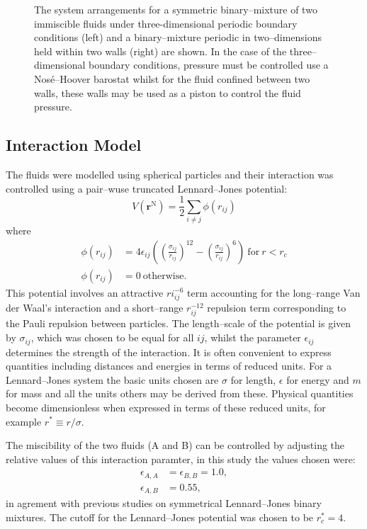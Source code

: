 \begin{figure}[h]
\caption{The system arrangements for a symmetric binary--mixture of two immiscible fluids under three-dimensional periodic boundary conditions (left) and a binary--mixture periodic in two--dimensions held within two walls (right) are shown. 
In the case of the three--dimensional boundary conditions, pressure must be controlled use a Nos\'{e}--Hoover barostat whilst for the fluid confined between two walls, these walls may be used as a piston to control the fluid pressure.}
\label{SetUp}
\end{figure}

\subsection{Interaction Model}\label{InteractionModel}
The fluids were modelled using spherical particles and their interaction was controlled using a pair--wuse truncated Lennard--Jones potential:
\begin{equation}
V \left( \mathbf{r}^{\mathrm{N}} \right) = \frac{1}{2} \sum_{i\neq j} \phi \left( r_{ij} \right)
\end{equation}
where
\begin{align}
\label{LJ}
\phi \left( r_{ij} \right) &= 4 \epsilon_{ij} \left( \left( \frac{\sigma_{ij}}{r_{ij}}\right)^{12} - \left( \frac{\sigma_{ij}}{r_{ij}}\right)^{6} \right)\ \mathrm{for}\ r < r_{c}\\
\phi \left( r_{ij} \right) &= 0\ \mathrm{otherwise}.
\end{align}
This potential involves an attractive $ri_{ij}^{-6}$ term accounting for the long--range Van der Waal's interaction and a short--range $r_{ij}^{-12}$ repulsion term corresponding to the Pauli repulsion between particles.
The length--scale of the potential is given by $\sigma_{ij}$, which was chosen to be equal for all $ij$, whilst the parameter $\epsilon_{ij}$ determines the strength of the interaction. 
It is often convenient to express quantities including distances and energies in terms of reduced units.
For a Lennard--Jones system the basic units chosen are $\sigma$ for length, $\epsilon$ for energy and $m$ for mass and all the units others may be derived from these.\cite{FrenkelSmit}
Physical quantities become dimensionless when expressed in terms of these reduced units, for example $r^{*} \equiv r / \sigma$.

The miscibility of the two fluids (A and B) can be controlled by adjusting the relative values of this interaction paramter, in this study the values chosen were:
\begin{align}
\epsilon_{A,A} &= \epsilon_{B,B} = 1.0,\\
\epsilon_{A,B} &= 0.55,
\end{align}
in agrement with previous studies on symmetrical Lennard--Jones binary mixtures.\cite{MorenzoRazo,Blas,HolgerBoppHampe}
The cutoff for the Lennard--Jones potential was chosen to be $r_{c}^{*} = 4$.

